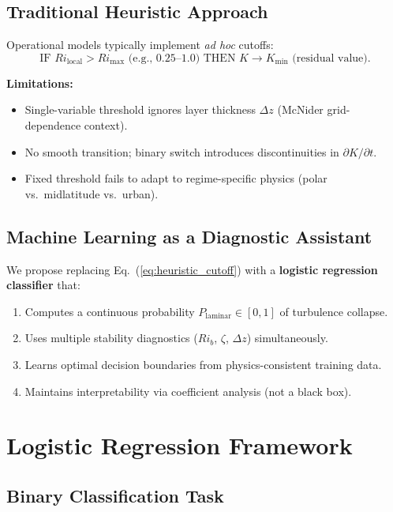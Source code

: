 \documentclass[11pt]{article}
\begin{document}
\subsection{Traditional Heuristic Approach}

Operational models typically implement \emph{ad hoc} cutoffs:
\begin{equation}
\text{IF } Ri_{\text{local}} > Ri_{\max} \text{ (e.g., } 0.25\text{--}1.0\text{) THEN } K \to K_{\text{min}} \text{ (residual value)}.
\label{eq:heuristic_cutoff}
\end{equation}

\textbf{Limitations:}
\begin{itemize}[leftmargin=*]
\item Single-variable threshold ignores layer thickness $\Delta z$ (McNider grid-dependence context).
\item No smooth transition; binary switch introduces discontinuities in $\partial K/\partial t$.
\item Fixed threshold fails to adapt to regime-specific physics (polar vs.\ midlatitude vs.\ urban).
\end{itemize}

\subsection{Machine Learning as a Diagnostic Assistant}

We propose replacing Eq.~(\ref{eq:heuristic_cutoff}) with a \textbf{logistic regression classifier} that:
\begin{enumerate}[leftmargin=*]
\item Computes a continuous probability $P_{\text{laminar}} \in [0,1]$ of turbulence collapse.
\item Uses multiple stability diagnostics ($Ri_b$, $\zeta$, $\Delta z$) simultaneously.
\item Learns optimal decision boundaries from physics-consistent training data.
\item Maintains interpretability via coefficient analysis (not a black box).
\end{enumerate}

\section{Logistic Regression Framework}

\subsection{Binary Classification Task}
\end{document}
